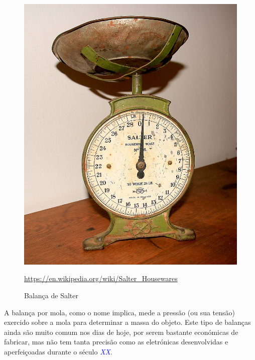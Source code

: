 \begin{figure}[H]
	\centering
	\includegraphics[scale=.3]{./image/PESTA/general/Weigh_Scale_Salter_1.jpg}
	\caption{Balança de Salter}
	\url{https://en.wikipedia.org/wiki/Salter_Housewares}
	\label{Weigh_Scale_Salter_1}
\end{figure}
A balança por mola, como o nome implica, mede a pressão (ou sua tensão) exercido sobre a mola para determinar a massa do objeto. Este tipo de balanças ainda são muito comum nos dias de hoje, por serem bastante económicas de fabricar, mas não tem tanta precisão como as eletrónicas desenvolvidas e aperfeiçoadas durante o século \textcolor{blue}{\textit{XX}}.
\\
